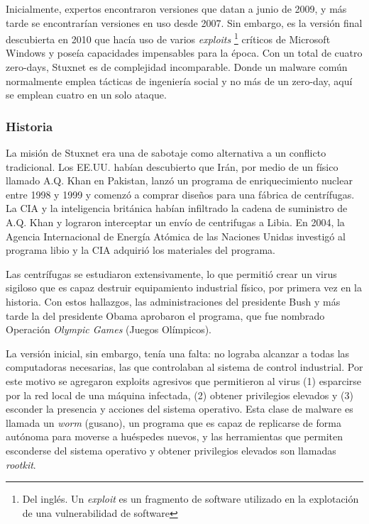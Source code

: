 \documentclass{article}
\begin{document}
Inicialmente, expertos encontraron versiones que datan a junio de 2009, y más tarde se encontrarían versiones en uso desde 2007. Sin embargo, es la versión final descubierta en 2010 que hacía uso de varios {\it exploits} \footnote{Del inglés. Un {\it exploit} es un fragmento de software utilizado en la explotación de una vulnerabilidad de software} críticos de Microsoft Windows y poseía capacidades impensables para la época. Con un total de cuatro zero-days, Stuxnet es de complejidad incomparable. Donde un malware común normalmente emplea tácticas de ingeniería social y no más de un zero-day, aquí se emplean cuatro en un solo ataque. \autocite{symantec-stuxnet} \autocite{reuters-stuxnet}

\subsubsection{Historia}
La misión de Stuxnet era una de sabotaje como alternativa a un conflicto tradicional. Los EE.UU. habían descubierto que Irán, por medio de un físico llamado A.Q. Khan en Pakistan, lanzó un programa de enriquecimiento nuclear entre 1998 y 1999 y comenzó a comprar diseños para una fábrica de centrífugas. La CIA y la inteligencia británica habían infiltrado la cadena de suministro de A.Q. Khan y lograron interceptar un envío de centrifugas a Libia. En 2004, la Agencia Internacional de Energía Atómica de las Naciones Unidas investigó al programa libio y la CIA adquirió los materiales del programa.

Las centrífugas se estudiaron extensivamente, lo que permitió crear un virus sigiloso que es capaz destruir equipamiento industrial físico, por primera vez en la historia. Con estos hallazgos, las administraciones del presidente Bush y más tarde la del presidente Obama aprobaron el programa, que fue nombrado Operación {\it Olympic Games} (Juegos Olímpicos).

La versión inicial, sin embargo, tenía una falta: no lograba alcanzar a todas las computadoras necesarias, las que controlaban al sistema de control industrial. Por este motivo se agregaron exploits agresivos que permitieron al virus (1) esparcirse por la red local de una máquina infectada, (2) obtener privilegios elevados y (3) esconder la presencia y acciones del sistema operativo. Esta clase de malware es llamada un {\it worm} (gusano), un programa que es capaz de replicarse de forma autónoma para moverse a huéspedes nuevos, y las herramientas que permiten esconderse del sistema operativo y obtener privilegios elevados son llamadas {\it rootkit}.
\end{document}
